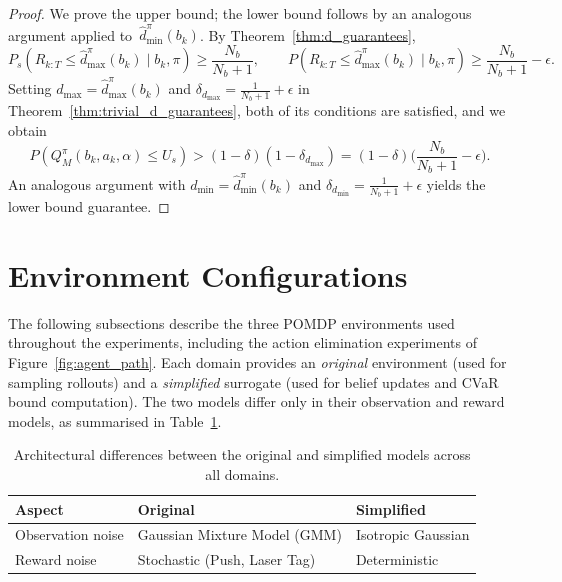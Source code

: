 \documentclass[acmlarge, manuscript, screen, review, natbib=false, oneside]{acmart}
\begin{document}
\begin{proof}
	We prove the upper bound; the lower bound follows by an analogous argument applied to~$\hat{d}_{\min}^\pi(b_k)$.
	By Theorem~\ref{thm:d_guarantees},
	\begin{equation}
		P_s(R_{k:T} \leq \hat{d}_{\max}^\pi(b_k) \mid b_k, \pi) \geq \frac{N_b}{N_b+1}, \qquad
		P(R_{k:T} \leq \hat{d}_{\max}^\pi(b_k) \mid b_k, \pi) \geq \frac{N_b}{N_b+1} - \epsilon.
	\end{equation}
	Setting $d_{\max} = \hat{d}_{\max}^\pi(b_k)$ and $\delta_{d_{\max}} = \frac{1}{N_b+1} + \epsilon$ in Theorem~\ref{thm:trivial_d_guarantees}, both of its conditions are satisfied, and we obtain
	\begin{equation}
		P(Q^\pi_M(b_k, a_k, \alpha) \leq U_s) > (1-\delta)(1-\delta_{d_{\max}}) = (1-\delta)\Big(\frac{N_b}{N_b+1} - \epsilon\Big).
	\end{equation}
	An analogous argument with $d_{\min} = \hat{d}_{\min}^\pi(b_k)$ and $\delta_{d_{\min}} = \frac{1}{N_b+1} + \epsilon$ yields the lower bound guarantee.
\end{proof}

\section{Environment Configurations}\label{sec:env_configs}

The following subsections describe the three POMDP environments used throughout the experiments, including the action elimination experiments of Figure~\ref{fig:agent_path}. Each domain provides an \emph{original} environment (used for sampling rollouts) and a \emph{simplified} surrogate (used for belief updates and CVaR bound computation). The two models differ only in their observation and reward models, as summarised in Table~\ref{tab:arch_overview}.

\begin{table}[ht]
	\centering
	\small
	\setlength{\tabcolsep}{6pt}
	\begin{tabular}{|l|l|l|}
		\hline
		\textbf{Aspect} & \textbf{Original} & \textbf{Simplified} \\
		\hline
		Observation noise & Gaussian Mixture Model (GMM) & Isotropic Gaussian \\
		\hline
		Reward noise & Stochastic (Push, Laser Tag) & Deterministic \\
		\hline
	\end{tabular}
	\caption{Architectural differences between the original and simplified models across all domains.}
	\label{tab:arch_overview}
\end{table}
\end{document}

